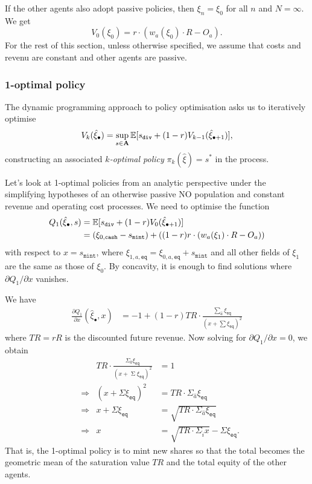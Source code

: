 If the other agents also adopt passive policies, then $\xi_n=\xi_0$ for all $n$ and $N=\infty$.
%
We get
\[
  V_0(\xi_0) = r\cdot (w_a(\xi_0)\cdot R - O_a).
\]
%
For the rest of this section, unless otherwise specified, we assume that costs and revenu are constant and other agents are passive.

\subsubsection{1-optimal policy} 
%
The dynamic programming approach to policy optimisation asks us to iteratively optimise
\[
  V_k(\hat{\xi}_\bullet) = \sup_{s\in\mathbf{A}} \mathbb{E}[s_\mathtt{div} + (1-r) V_{k-1}(\hat{\xi}_{\bullet+1}) ],
\]
constructing an associated \emph{$k$-optimal policy} $\pi_k(\hat{\xi})=s^*$ in the process.

Let's look at 1-optimal policies from an analytic perspective under the simplifying hypotheses of an otherwise passive NO population and constant revenue and operating cost processes.
%
We need to optimise the function
\begin{align*}
  Q_1(\hat{\xi}_\bullet,s) &= \mathbb{E}[s_\mathtt{div} + (1-r) V_0(\hat{\xi}_{\bullet+1}) ] \\
  &= (\xi_{0,\mathtt{cash}} - s_\mathtt{mint}) + ((1-r) r\cdot (w_a(\xi_1)\cdot R - O_a))
\end{align*}
with respect to $x=s_\mathtt{mint}$, where $\xi_{1,a,\mathtt{eq}}= \xi_{0,a,\mathtt{eq}} + s_\mathtt{mint} $ and all other fields of $\xi_1$ are the same as those of $\xi_0$.
%
By concavity, it is enough to find solutions where $\partial Q_1/\partial x$ vanishes.

We have
\begin{align*}
  \frac{\partial Q_1}{\partial x}(\hat{\xi}_\bullet,x) &= -1 + (1-r) TR \cdot\frac{\sum_{\hat{a}} \xi_\mathtt{eq}}{(x+\sum \xi_\mathtt{eq})^2}
\end{align*}
where $TR=rR$ is the discounted future revenue.
%
Now solving for $\partial Q_1/\partial x = 0$, we obtain
\begin{align*}
  && TR\cdot\frac{\Sigma_{\hat{a}} \xi_\mathtt{eq}}{(x + \mathop{\Sigma} \xi_\mathtt{eq})^2} &= 1 \\
  &\Rightarrow& (x + \Sigma \xi_\mathtt{eq})^2 &= TR \cdot \Sigma_{\hat{a}} \xi_\mathtt{eq} \\
  &\Rightarrow& x + \Sigma \xi_\mathtt{eq} &= \sqrt{ TR\cdot \Sigma_{\hat{a}} \xi_\mathtt{eq} }  \\
  &\Rightarrow& x &= \sqrt{ TR\cdot \Sigma_{\hat{i}} x  } - \Sigma \xi_\mathtt{eq}.
\end{align*}
%
That is, the 1-optimal policy is to mint new shares so that the total becomes the geometric mean of the saturation value $TR$ and the total equity of the other agents.




